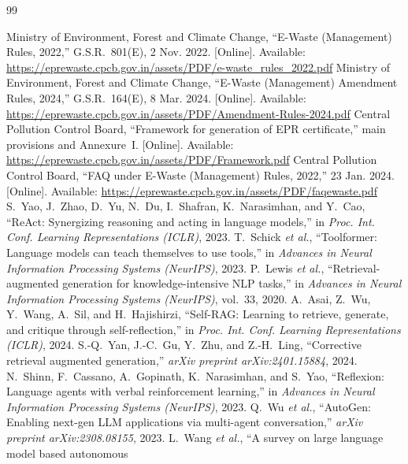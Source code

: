 \begin{thebibliography}{99}
 Ministry of Environment, Forest and Climate Change, ``E-Waste (Management)
Rules, 2022,'' G.S.R.~801(E), 2 Nov. 2022. [Online]. Available:
\url{https://eprewaste.cpcb.gov.in/assets/PDF/e-waste_rules_2022.pdf}
 Ministry of Environment, Forest and Climate Change, ``E-Waste (Management)
Amendment Rules, 2024,'' G.S.R.~164(E), 8 Mar. 2024. [Online]. Available:
\url{https://eprewaste.cpcb.gov.in/assets/PDF/Amendment-Rules-2024.pdf}
 Central Pollution Control Board, ``Framework for generation of EPR
certificate,'' main provisions and Annexure~I. [Online]. Available:
\url{https://eprewaste.cpcb.gov.in/assets/PDF/Framework.pdf}
 Central Pollution Control Board, ``FAQ under E-Waste (Management) Rules, 2022,''
23 Jan. 2024. [Online]. Available: \url{https://eprewaste.cpcb.gov.in/assets/PDF/faqewaste.pdf}
 S.~Yao, J.~Zhao, D.~Yu, N.~Du, I.~Shafran, K.~Narasimhan, and Y.~Cao,
``ReAct: Synergizing reasoning and acting in language models,'' in \emph{Proc. Int. Conf. Learning
Representations (ICLR)}, 2023.
 T.~Schick \emph{et al.}, ``Toolformer: Language models can teach
themselves to use tools,'' in \emph{Advances in Neural Information Processing Systems (NeurIPS)}, 2023.
 P.~Lewis \emph{et al.}, ``Retrieval-augmented generation for
knowledge-intensive NLP tasks,'' in \emph{Advances in Neural Information Processing Systems
(NeurIPS)}, vol.~33, 2020.
 A.~Asai, Z.~Wu, Y.~Wang, A.~Sil, and H.~Hajishirzi, ``Self-RAG: Learning
to retrieve, generate, and critique through self-reflection,'' in \emph{Proc. Int. Conf. Learning
Representations (ICLR)}, 2024.
 S.-Q.~Yan, J.-C.~Gu, Y.~Zhu, and Z.-H.~Ling, ``Corrective retrieval augmented
generation,'' \emph{arXiv preprint arXiv:2401.15884}, 2024.
 N.~Shinn, F.~Cassano, A.~Gopinath, K.~Narasimhan, and S.~Yao,
``Reflexion: Language agents with verbal reinforcement learning,'' in \emph{Advances in Neural
Information Processing Systems (NeurIPS)}, 2023.
 Q.~Wu \emph{et al.}, ``AutoGen: Enabling next-gen LLM applications via
multi-agent conversation,'' \emph{arXiv preprint arXiv:2308.08155}, 2023.
 L.~Wang \emph{et al.}, ``A survey on large language model based autonomous

\end{thebibliography}
